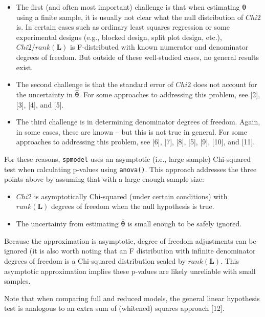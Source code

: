 \documentclass[10pt,letterpaper]{article}
\providecommand{\tightlist}{%
  \setlength{\itemsep}{0pt}\setlength{\parskip}{0pt}}
\begin{document}
\begin{itemize}
\tightlist
\item
  The first (and often most important) challenge is that when estimating
  \(\boldsymbol{\theta}\) using a finite sample, it is usually not clear
  what the null distribution of \(Chi2\) is. In certain cases such as
  ordinary least squares regression or some experimental designs (e.g.,
  blocked design, split plot design, etc.), \(Chi2 / rank(\mathbf{L})\)
  is F-distributed with known numerator and denominator degrees of
  freedom. But outside of these well-studied cases, no general results
  exist.
\item
  The second challenge is that the standard error of \(Chi2\) does not
  account for the uncertainty in \(\boldsymbol{\hat{\theta}}\). For some
  approaches to addressing this problem, see {[}2{]}, {[}3{]}, {[}4{]},
  and {[}5{]}.
\item
  The third challenge is in determining denominator degrees of freedom.
  Again, in some cases, these are known -- but this is not true in
  general. For some approaches to addressing this problem, see {[}6{]},
  {[}7{]}, {[}8{]}, {[}5{]}, {[}9{]}, {[}10{]}, and {[}11{]}.
\end{itemize}

For these reasons, \texttt{spmodel} uses an asymptotic (i.e., large
sample) Chi-squared test when calculating p-values using
\texttt{anova()}. This approach addresses the three points above by
assuming that with a large enough sample size:

\begin{itemize}
\tightlist
\item
  \(Chi2\) is asymptotically Chi-squared (under certain conditions) with
  \(rank(\mathbf{L})\) degrees of freedom when the null hypothesis is
  true.
\item
  The uncertainty from estimating \(\boldsymbol{\hat{\theta}}\) is small
  enough to be safely ignored.
\end{itemize}

Because the approximation is asymptotic, degree of freedom adjustments
can be ignored (it is also worth noting that an F distribution with
infinite denominator degrees of freedom is a Chi-squared distribution
scaled by \(rank(\mathbf{L})\). This asymptotic approximation implies
these p-values are likely unreliable with small samples.

Note that when comparing full and reduced models, the general linear
hypothesis test is analogous to an extra sum of (whitened) squares
approach {[}12{]}.
\end{document}
